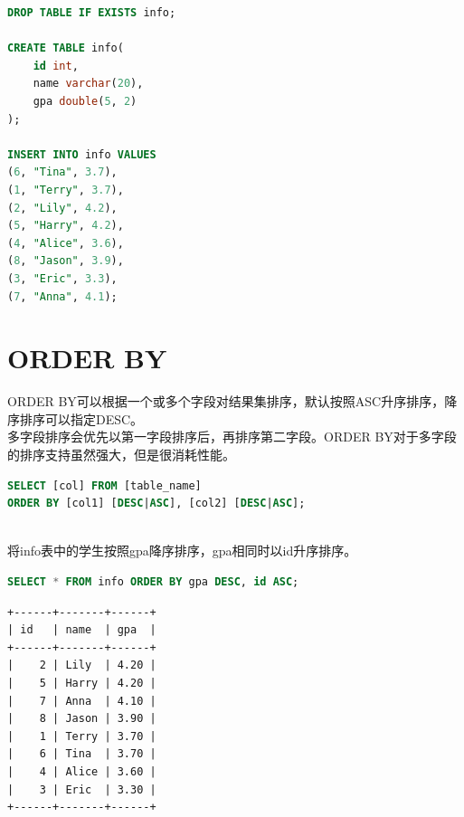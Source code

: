 \documentclass[12pt, openany, oneside]{book}
\begin{document}

\begin{lstlisting}[language=SQL]
DROP TABLE IF EXISTS info;

CREATE TABLE info(
    id int,
    name varchar(20),
    gpa double(5, 2)
);

INSERT INTO info VALUES
(6, "Tina", 3.7),
(1, "Terry", 3.7),
(2, "Lily", 4.2),
(5, "Harry", 4.2),
(4, "Alice", 3.6),
(8, "Jason", 3.9),
(3, "Eric", 3.3),
(7, "Anna", 4.1);
\end{lstlisting}

\vspace{0.5cm}

\section{ORDER BY}

ORDER BY可以根据一个或多个字段对结果集排序，默认按照ASC升序排序，降序排序可以指定DESC。\\

多字段排序会优先以第一字段排序后，再排序第二字段。ORDER BY对于多字段的排序支持虽然强大，但是很消耗性能。

\vspace{-0.5cm}

\begin{lstlisting}[language=SQL]
SELECT [col] FROM [table_name]
ORDER BY [col1] [DESC|ASC], [col2] [DESC|ASC];
\end{lstlisting}

\vspace{0.5cm}

\\

将info表中的学生按照gpa降序排序，gpa相同时以id升序排序。

\vspace{-0.5cm}

\begin{lstlisting}[language=SQL]
SELECT * FROM info ORDER BY gpa DESC, id ASC;
\end{lstlisting}

\begin{tcolorbox}
\begin{verbatim}
+------+-------+------+
| id   | name  | gpa  |
+------+-------+------+
|    2 | Lily  | 4.20 |
|    5 | Harry | 4.20 |
|    7 | Anna  | 4.10 |
|    8 | Jason | 3.90 |
|    1 | Terry | 3.70 |
|    6 | Tina  | 3.70 |
|    4 | Alice | 3.60 |
|    3 | Eric  | 3.30 |
+------+-------+------+
\end{verbatim}
\end{tcolorbox}
\end{document}
